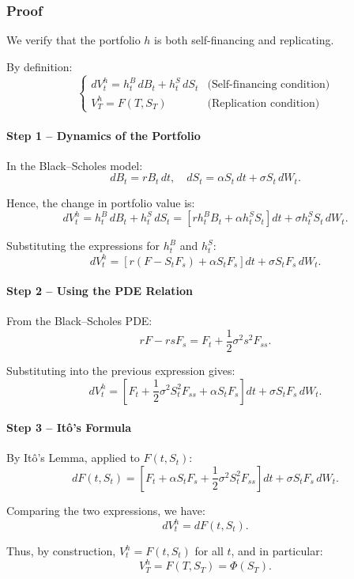 \documentclass[12pt,a4paper]{article}
\theoremstyle{definition}
\begin{document}
\subsubsection{Proof}

We verify that the portfolio $h$ is both self-financing and replicating.

By definition:
\[
\begin{cases}
dV_t^h = h_t^B \, dB_t + h_t^S \, dS_t & \text{(Self-financing condition)} \\
V_T^h = F(T, S_T) & \text{(Replication condition)}
\end{cases}
\]

\paragraph{Step 1 – Dynamics of the Portfolio}

In the Black–Scholes model:
\[
dB_t = rB_t \, dt, \quad dS_t = \alpha S_t \, dt + \sigma S_t \, dW_t.
\]

Hence, the change in portfolio value is:
\[
dV_t^h = h_t^B \, dB_t + h_t^S \, dS_t = [rh_t^B B_t + \alpha h_t^S S_t] dt + \sigma h_t^S S_t \, dW_t.
\]

Substituting the expressions for $h_t^B$ and $h_t^S$:
\[
dV_t^h = [r(F - S_t F_s) + \alpha S_t F_s] dt + \sigma S_t F_s \, dW_t.
\]

\paragraph{Step 2 – Using the PDE Relation}

From the Black–Scholes PDE:
\[
rF - rsF_s = F_t + \frac{1}{2}\sigma^2 s^2 F_{ss}.
\]

Substituting into the previous expression gives:
\[
dV_t^h = [F_t + \frac{1}{2}\sigma^2 S_t^2 F_{ss} + \alpha S_t F_s] dt + \sigma S_t F_s \, dW_t.
\]

\paragraph{Step 3 – Itô's Formula}

By Itô's Lemma, applied to $F(t, S_t)$:
\[
dF(t, S_t) = [F_t + \alpha S_t F_s + \frac{1}{2}\sigma^2 S_t^2 F_{ss}] dt + \sigma S_t F_s \, dW_t.
\]

Comparing the two expressions, we have:
\[
dV_t^h = dF(t, S_t).
\]

Thus, by construction, $V_t^h = F(t, S_t)$ for all $t$, and in particular:
\[
V_T^h = F(T, S_T) = \Phi(S_T).
\]
\end{document}

